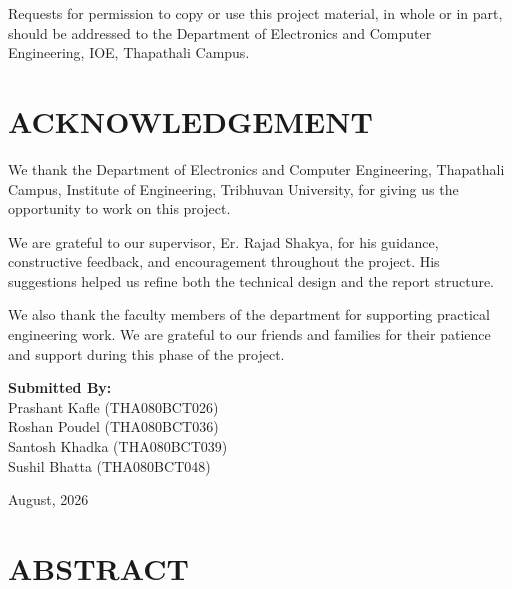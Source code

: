 \documentclass[12pt,a4paper,openany]{report}
\begin{document}
Requests for permission to copy or use this project material, in whole or in part, should be addressed to the Department of Electronics and Computer Engineering, IOE, Thapathali Campus.

\clearpage

\chapter*{ACKNOWLEDGEMENT}

\begin{small}
We thank the Department of Electronics and Computer Engineering, Thapathali Campus, Institute of Engineering, Tribhuvan University, for giving us the opportunity to work on this project.

We are grateful to our supervisor, Er. Rajad Shakya, for his guidance, constructive feedback, and encouragement throughout the project. His suggestions helped us refine both the technical design and the report structure.

We also thank the faculty members of the department for supporting practical engineering work. We are grateful to our friends and families for their patience and support during this phase of the project.

\vspace{2em}
\noindent\textbf{Submitted By:}\\
Prashant Kafle (THA080BCT026)\\
Roshan Poudel (THA080BCT036)\\
Santosh Khadka (THA080BCT039)\\
Sushil Bhatta (THA080BCT048)

\vspace{1em}
\hfill August, 2026
\end{small}

\clearpage

\chapter*{ABSTRACT}
\end{document}

